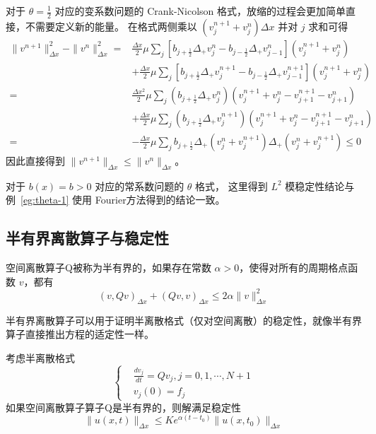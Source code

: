 \begin{remark}
    对于 $\theta = \frac12$ 对应的变系数问题的 Crank-Nicolson 格式，放缩的过程会更加简单直接，不需要定义新的能量。
    在格式两侧乘以 $(v_j^{n+1} + v_j^n)\Delta x$ 并对 $j$ 求和可得
    \begin{align*}
        \| v^{n+1}\|_{\Delta x}^2 - \| v^{n}\|_{\Delta x}^2
        ={} &
        \frac{\Delta x}2\mu \sum_j \left[ b_{j+\frac12} \Delta_+ v_{j}^n
            - b_{j-\frac12} \Delta_+ v_{j-1}^{n} \right](v_j^{n+1} + v_j^n)
        \\
            &
        + \frac{\Delta x}2\mu \sum_j \left[ b_{j+\frac12} \Delta_+ v_j^{n+1}
        - b_{j-\frac12} \Delta_+ v_{j-1}^{n+1} \right](v_j^{n+1} + v_j^n)
        \\
        ={} & \frac{\Delta x^2}2\mu \sum_j \left( b_{j+\frac12} \Delta_+ v_{j}^n \right)
        (v_j^{n+1} + v_j^n - v_{j+1}^{n+1} - v_{j+1}^n)
        \\
            &
        + \frac{\Delta x}2\mu \sum_j  \left( b_{j+\frac12} \Delta_+ v_{j}^{n+1} \right)
        (v_j^{n+1} + v_j^n - v_{j+1}^{n+1} - v_{j+1}^n)
        \\
        ={} & - \frac{\Delta x}2\mu \sum_j   b_{j+\frac12} \Delta_+ (v_{j}^n + v_{j}^{n+1})
        \Delta_+ (v_{j}^n + v_{j}^{n+1}) \le 0
    \end{align*}
    因此直接得到 $\| v^{n+1}\|_{\Delta x} \le \| v^{n}\|_{\Delta x}$。
\end{remark}


\begin{remark}
    对于 $b(x) = b > 0$ 对应的常系数问题的 $\theta$ 格式，
    这里得到 $L^2$ 模稳定性结论与例~\ref{eg:theta-1} 使用 Fourier方法得到的结论一致。
\end{remark}

\subsection{半有界离散算子与稳定性}

\begin{definition}
    空间离散算子Q被称为半有界的，如果存在常数 $\alpha > 0$，使得对所有的周期格点函数 $v$，都有
    \[
        (v,Q v)_{\Delta x} + (Q v,v)_{\Delta x} \le 2 \alpha \| v \|_{\Delta x}^2
    \]
\end{definition}

半有界离散算子可以用于证明半离散格式（仅对空间离散）的稳定性，就像半有界算子直接推出方程的适定性一样。
\begin{theorem}
    考虑半离散格式
    \[
        \left\{
        \begin{aligned}
             & \frac{d v_j}{d t} = Q v_j, j=0,1,\cdots,N+1 \\
             & v_j(0) = f_j
        \end{aligned}
        \right.
    \]
    如果空间离散算子算子Q是半有界的，则解满足稳定性
    \[
        \| u(x,t) \|_{\Delta x} \le
        K e^{\alpha(t-t_0)} \| u(x,t_0) \|_{\Delta x}
    \]
\end{theorem}

